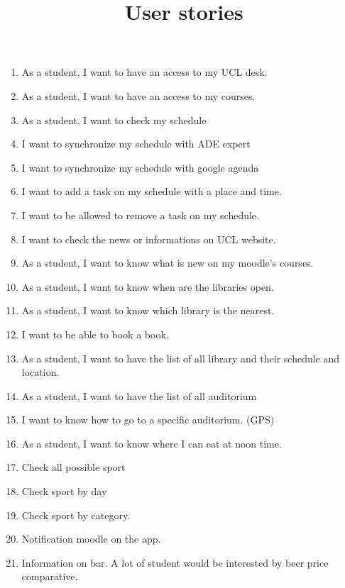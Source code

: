 \documentclass{article}
\title{User stories}
\begin{document}
\maketitle

\begin{enumerate}

\item As a student, I want to have an access to my UCL desk.

\item As a student, I want to have an access to my courses.

\item As a student, I want to check my schedule
\item I want to synchronize my schedule with ADE expert
\item I want to synchronize my schedule with google agenda
\item I want to add a task on my schedule with a place and time.
\item I want to be allowed to remove a task on my schedule.
\item I want to check the news or informations on UCL website. 

\item As a student, I want to know what is new on my moodle's courses.

\item As a student, I want to know when are the libraries open.
\item As a student, I want to know which library is the nearest.
\item I want to be able to book a book.
\item As a student, I want to have the list of all library and their schedule and location.
\item As a student, I want to have the list of all auditorium
\item I want to know how to go to a specific auditorium. (GPS)

\item As a student, I want to know where I can eat at noon time.
\item Check all possible sport
\item Check sport by day
\item Check sport by category.
\item Notification moodle on the app.

\item Information on bar. A lot of student would be interested by beer price comparative.


\end{enumerate}
\end{document}
